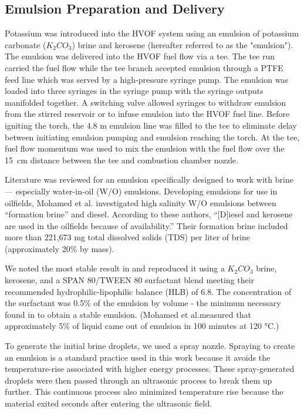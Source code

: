 \clearpage
\subsection{Emulsion Preparation and Delivery}

Potassium was introduced into the HVOF system using an emulsion of potassium carbonate ($K_{2}CO_{3}$) brine and kerosene (hereafter referred to as the "emulsion"). The emulsion was delivered into the HVOF fuel flow via a tee. The tee run carried the fuel flow while the tee branch accepted emulsion through a PTFE feed line which was served by a high-pressure syringe pump. The emulsion was loaded into three syringes in the syringe pump with the syringe outputs manifolded together. A switching valve allowed syringes to withdraw emulsion from the stirred reservoir or to infuse emulsion into the HVOF fuel line. Before igniting the torch, the 4.8 m emulsion line was filled to the tee to eliminate delay between initiating emulsion pumping and emulsion reaching the torch. At the tee, fuel flow momentum was used to mix the emulsion with the fuel flow over the \SI{15} {cm} distance between the tee and combustion chamber nozzle. 

Literature was reviewed for an emulsion specifically designed to work with brine — especially water-in-oil (W/O) emulsions. Developing emulsions for use in oilfields, Mohamed et al. \cite{mohamedInfluenceSurfactantStructure2017a} investigated high salinity W/O emulsions between “formation brine” and diesel. According to these authors, “[D]iesel and kerosene are used in the oilfields because of availability.” Their formation brine included more than 221,673 mg total dissolved solids (TDS) per liter of brine (approximately 20\% by mass).  

We noted the most stable result in \cite{mohamedInfluenceSurfactantStructure2017a} and reproduced it using a $K_{2}CO_{3}$ brine, kerosene, and a SPAN 80/TWEEN 80 surfactant blend meeting their recommended hydrophilic-lipophilic balance (HLB) of 6.8. The concentration of the surfactant was 0.5\% of the emulsion by volume - the minimum necessary found in \cite{mohamedInfluenceSurfactantStructure2017a} to obtain a stable emulsion. (Mohamed et al.measured that approximately 5\% of liquid came out of emulsion in 100 minutes at 120 °C.)  

To generate the initial brine droplets, we used a spray nozzle. Spraying to create an emulsion is a standard practice used in this work because it avoids the temperature-rise associated with higher energy processes. \cite{atkinsonKeroseneEmulsionHow1890} These spray-generated droplets were then passed through an ultrasonic process to break them up further. This continuous process also minimized temperature rise because the material exited seconds after entering the ultrasonic field. 

